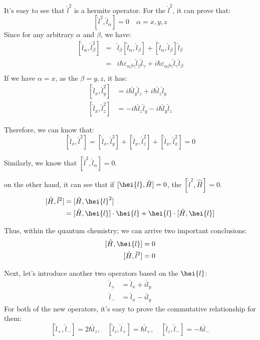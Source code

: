 It's easy to see that $\hat{l}^{2}$ is a hermite operator. For the
$\hat{l}^{2}$, it can prove that:
\begin{equation}\label{}
[\hat{l}^{2}, \hat{l}_{\alpha}] = 0 \quad \text{$\alpha = x, y, z$}
\end{equation}
Since for any arbitrary $\alpha$ and $\beta$, we have:
\begin{eqnarray}
  [\hat{l}_{\alpha}, \hat{l}^{2}_{\beta}] &=&  \hat{l}_{\beta}[\hat{l}_{\alpha}, \hat{l}_{\beta}] + [\hat{l}_{\alpha},
  \hat{l}_{\beta}]\hat{l}_{\beta} \nonumber \\
   &=& i\hbar\varepsilon_{\alpha\beta\gamma}\hat{l}_{\beta} \hat{l}_{\gamma}  + i\hbar
   \varepsilon_{\alpha\beta\gamma}\hat{l}_{\gamma}\hat{l}_{\beta} \nonumber \\
\end{eqnarray}
If we have $\alpha = x$, as the $\beta = y, z$, it has:
\begin{align}\label{}
  [\hat{l}_{x}, \hat{l}^{2}_{y}] &= i\hbar\hat{l}_{y} \hat{l}_{z}  + i\hbar
   \hat{l}_{z}\hat{l}_{y} \nonumber \\
  [\hat{l}_{x}, \hat{l}^{2}_{z}] &= -i\hbar\hat{l}_{z} \hat{l}_{y}  - i\hbar
   \hat{l}_{y}\hat{l}_{z}
\end{align}

Therefore, we can know that:
\begin{equation}\label{}
[\hat{l}_{x}, \hat{l}^{2}] = [\hat{l}_{x}, \hat{l}^{2}_{y}] +
[\hat{l}_{x}, \hat{l}^{2}_{z}] + [\hat{l}_{x}, \hat{l}^{2}_{x}] = 0
\end{equation}

Similarly, we know that $[\hat{l}^{2}, \hat{l}_{\alpha}] = 0$.

on the other hand, it can see that if $[\hei{l}, \hat{H}] = 0$, the
$[\hat{l}^{2}, \hat{H}] = 0$.
\begin{align}\label{}
[\hat{H}, \hat{l}^{2}] &= [\hat{H}, \hei{l}^{2}] \nonumber \\
&=[\hat{H}, \hei{l}]\cdot\hei{l} + \hei{l}\cdot[\hat{H}, \hei{l}]
\end{align}

Thus, within the quantum chemistry; we can arrive two important
conclusions:
\begin{align}\label{}
[\hat{H}, \hei{l}] &= 0 \nonumber \\
[\hat{H}, \hat{l}^{2}] &= 0
\end{align}

Next, let's introduce another two operators based on the $\hei{l}$:
\begin{align}\label{}
\hat{l}_{+} &= \hat{l}_{x} + i\hat{l}_{y}  \nonumber \\
\hat{l}_{-} &= \hat{l}_{x} - i\hat{l}_{y}
\end{align}
For both of the new operators, it's easy to prove the commutative
relationship for them:
\begin{equation}\label{}
[\hat{l}_{+}, \hat{l}_{-}] = 2\hbar\hat{l}_{z}, \quad [\hat{l}_{z},
\hat{l}_{+}] = \hbar\hat{l}_{+}, \quad [\hat{l}_{z}, \hat{l}_{-}] =
-\hbar\hat{l}_{-}
\end{equation}

